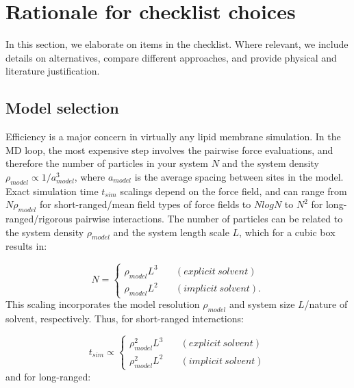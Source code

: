 \documentclass[9pt,bestpractices,pubversion]{livecoms}
\begin{document}
\begin{Checklists*}[p!]
\end{Checklists*}


\section{Rationale for checklist choices}
\label{sec:rationale}

In this section, we elaborate on items in the checklist. Where relevant, we include details on alternatives, compare different approaches, and provide physical and literature justification.

\subsection{Model selection}
\label{subsec:models4}
Efficiency is a major concern in virtually any lipid membrane simulation.
In the MD loop, the most expensive step involves the pairwise force evaluations, and therefore the number of particles in your system $N$ and the system density $\rho_{model} \propto 1/a_{model}^3$, where $a_{model}$ is the average spacing between sites in the model.
Exact simulation time $t_{sim}$ scalings depend on the force field, and can range from $N \rho_{model}$ for short-ranged/mean field types of force fields to $NlogN$ to $N^2$ for long-ranged/rigorous pairwise interactions.
The number of particles can be related to the system density $\rho_{model}$ and the system length scale $L$, which for a cubic box results in:

\begin{equation}\label{eq:14}
	N = \left\{
        		\begin{array}{ll}
            		\rho_{model} L^3 & \quad (explicit \: solvent) \\
            		\rho_{model} L^2 & \quad (implicit \: solvent).
        		\end{array}
    	\right.
\end{equation}
This scaling incorporates the model resolution $\rho_{model}$ and system size $L$/nature of solvent, respectively.
Thus, for short-ranged interactions:

\begin{equation}\label{eq:15}
	t_{sim} \propto \left\{
        		\begin{array}{ll}
            		\rho_{model}^2 L^3 & \quad (explicit \: solvent) \\
            		\rho_{model}^2 L^2 & \quad (implicit \: solvent)
        		\end{array}
    	\right.
\end{equation}
and for long-ranged:
\end{document}

